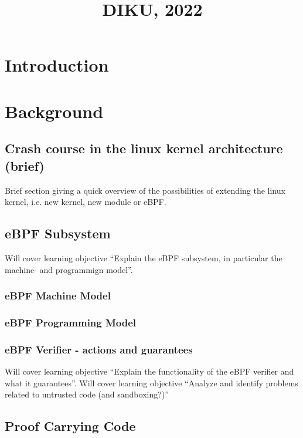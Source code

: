 

\title{\course\small{DIKU, 2022}}


\maketitle

\hrulefill

\section{Introduction}
\label{sec:introduction}

\section{Background}
\label{sec:background}

\subsection{Crash course in the linux kernel architecture (brief)}
\label{subsec:crash_course_in_the_linux_kernel_architecture_(brief)}
Brief section giving a quick overview of the possibilities of extending the linux kernel, i.e. new kernel, new module or eBPF.


\subsection{eBPF Subsystem}
\label{subsec:ebpf_subsystem}
Will cover learning objective ``Explain the eBPF subsystem, in particular the machine- and programmign model''.

\subsubsection{eBPF Machine Model}
\subsubsection{eBPF Programming Model}
\subsubsection{eBPF Verifier - actions and guarantees}
Will cover learning objective ``Explain the functionality of the eBPF verifier and what it guarantees''.
Will cover learning objective ``Analyze and identify problems related to untrusted code (and sandboxing?)''
\subsection{Proof Carrying Code}
\label{subsec:proof_carrying_code}


